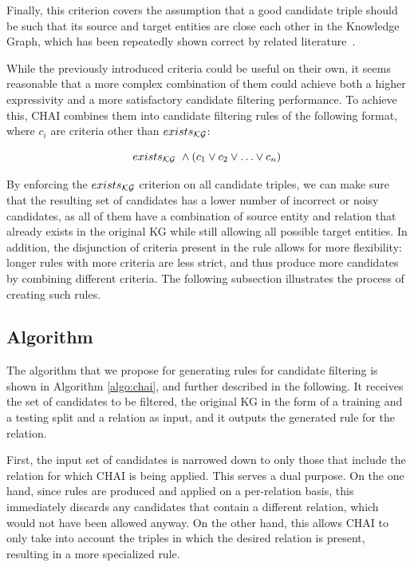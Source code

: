 Finally, this criterion covers the assumption that a good candidate triple should be such that its source and target entities are close each other in the Knowledge Graph, which has been repeatedly shown correct by related literature~\cite{borrego2021, ferre2019, oh2018, bansal2019a2n, bansal2020negatives, kong2019}.

While the previously introduced criteria could be useful on their own, it seems reasonable that a more complex combination of them could achieve both a higher expressivity and a more satisfactory candidate filtering performance. To achieve this, CHAI combines them into candidate filtering rules of the following format, where $c_i$ are criteria other than $exists_{\textmd{\textup{\ensuremath{\mathcal{K}}\ensuremath{\mathcal{G}}}}}$:

\begin{equation*}
    \centering
    exists_\KG~\wedge (c_1 \vee c_2 \vee \ldots \vee c_n)
\end{equation*}

By enforcing the $exists_{\textmd{\textup{\ensuremath{\mathcal{K}}\ensuremath{\mathcal{G}}}}}$ criterion on all candidate triples, we can make sure that the resulting set of candidates has a lower number of incorrect or noisy candidates, as all of them have a combination of source entity and relation that already exists in the original KG while still allowing all possible target entities. In addition, the disjunction of criteria present in the rule allows for more flexibility: longer rules with more criteria are less strict, and thus produce more candidates by combining different criteria. The following subsection illustrates the process of creating such rules.

\subsection{Algorithm}\label{sec:chai-algorithm}
The algorithm that we propose for generating rules for candidate filtering is shown in Algorithm \ref{algo:chai}, and further described in the following. It receives the set of candidates to be filtered, the original KG in the form of a training and a testing split and a relation as input, and it outputs the generated rule for the relation.



First, the input set of candidates is narrowed down to only those that include the relation for which CHAI is being applied. This serves a dual purpose. On the one hand, since rules are produced and applied on a per-relation basis, this immediately discards any candidates that contain a different relation, which would not have been allowed anyway. On the other hand, this allows CHAI to only take into account the triples in which the desired relation is present, resulting in a more specialized rule.

